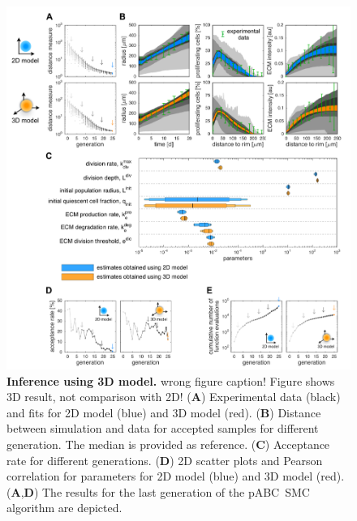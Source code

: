 \documentclass[10pt,letterpaper]{article}
\newcommand{\nj}[1]{{\color{blue}#1}}
\begin{document}
\begin{figure}[p]
\begin{adjustwidth}{-2in}{0in} %
\begin{center}
\includegraphics{fig__2D_3D_comparison.pdf}
\end{center}
\vspace*{0.5cm}
\caption{{\bf Inference using 3D model.} \nj{wrong figure caption! Figure shows 3D result, not comparison with 2D!}
(\textbf{A}) Experimental data (black) and fits for 2D model (blue) and 3D model (red).
(\textbf{B}) Distance between simulation and data for accepted samples for different generation. The median is provided as reference. 
(\textbf{C}) Acceptance rate for different generations.
(\textbf{D}) 2D scatter plots and Pearson correlation for parameters for 2D model (blue) and 3D model (red). 
(\textbf{A},\textbf{D}) The results for the last generation of the pABC~SMC algorithm are depicted.
}
\label{fig: fitting of 3D model to experimental data for case without nutrition limitation}
\end{adjustwidth}
\end{figure}
\end{document}
